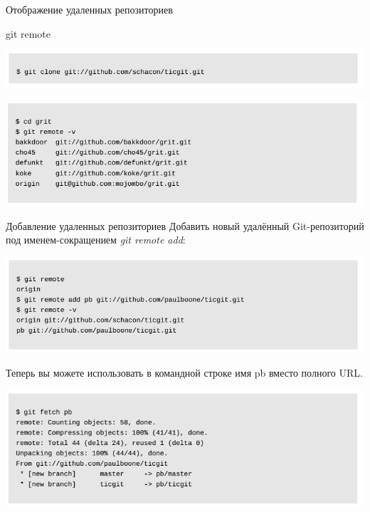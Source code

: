 \documentclass{beamer}
\begin{document}
\begin{frame}{Отображение удаленных репозиториев}
\begin{block}{git remote}
\begin{center}
\includegraphics[scale=0.5]{images/remote-1.png}
\end{center}
\begin{center}
\includegraphics[scale=0.5]{images/remote-2.png}
\end{center}
\end{block}
\end{frame}

\begin{frame}{Добавление удаленных репозиториев}
Добавить новый удалённый Git-репозиторий под именем-сокращением \textit{git remote add}:
\begin{center}
\includegraphics[scale=0.4]{images/remote-3.png}
\end{center}
Теперь вы можете использовать в командной строке имя pb вместо полного URL. 
\begin{center}
\includegraphics[scale=0.4]{images/remote-4.png}
\end{center}
\end{frame}
\end{document}
